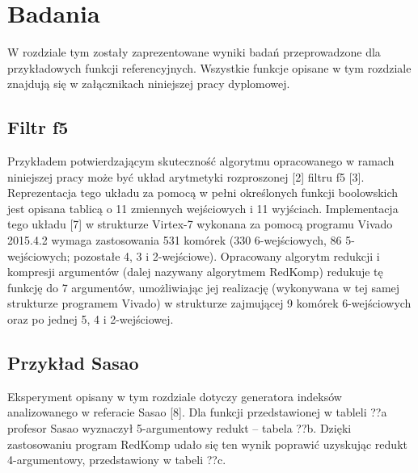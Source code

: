 \chapter{Badania}
\label{chapter:research}

W rozdziale tym zostały zaprezentowane wyniki badań przeprowadzone dla przykładowych funkcji referencyjnych.
Wszystkie funkcje opisane w tym rozdziale znajdują się w załącznikach niniejszej pracy dyplomowej.

\section{Filtr f5}

Przykładem potwierdzającym skuteczność algorytmu opracowanego w ramach niniejszej pracy
może być układ arytmetyki rozproszonej [2] filtru f5 [3].
Reprezentacja tego układu za pomocą w pełni określonych funkcji boolowskich
jest opisana tablicą o 11 zmiennych wejściowych i 11 wyjściach.
Implementacja tego układu [7] w strukturze Virtex-7 wykonana za pomocą programu Vivado 2015.4.2
wymaga zastosowania 531 komórek (330 6-wejściowych, 86 5-wejściowych; pozostałe 4, 3 i 2-wejściowe).
Opracowany algorytm redukcji i kompresji argumentów (dalej nazywany algorytmem RedKomp)
redukuje tę funkcję do 7 argumentów,
umożliwiając jej realizację
(wykonywana w tej samej strukturze programem Vivado)
w strukturze zajmującej 9 komórek 6-wejściowych oraz po jednej 5, 4 i 2-wejściowej.

\section{Przykład Sasao}

Eksperyment opisany w tym rozdziale dotyczy generatora indeksów analizowanego w referacie Sasao [8].
Dla funkcji przedstawionej w tableli ??a profesor Sasao wyznaczył 5-argumentowy redukt – tabela ??b.
Dzięki zastosowaniu program RedKomp udało się ten wynik poprawić uzyskując redukt 4-argumentowy,
przedstawiony w tabeli ??c.

